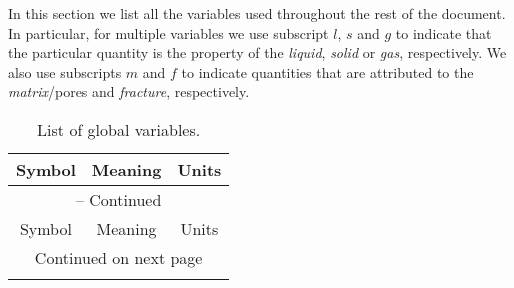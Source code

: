 In this section we list all the variables used throughout the rest of the document.
In particular,
for multiple variables we use subscript 
$l$, $s$ and $g$
to indicate that the particular quantity is the property of the  
\emph{liquid}, \emph{solid} or \emph{gas}, respectively.
We also use subscripts $m$ and $f$
to indicate quantities that are attributed to the  
\emph{matrix}/pores and  \emph{fracture}, respectively.


\begin{center}
\begin{longtable}{cp{7cm}c}
\caption{List of global variables.} \label{table:flow-list-of-variables} \\

\multicolumn{1}{c}{Symbol} & \multicolumn{1}{c}{Meaning} & \multicolumn{1}{c}{Units} \\
\hline  \hline 
\endfirsthead

\multicolumn{3}{c}{{\tablename} \thetable{} -- Continued} \\
\multicolumn{1}{c}{Symbol} & \multicolumn{1}{c}{Meaning} & \multicolumn{1}{c}{Units} \\
\hline  \hline 
\endhead

\hline \multicolumn{3}{c}{{Continued on next page}} \\ 
\hline \hline 
\endfoot

\hline \hline
\endlastfoot


\end{longtable}
\end{center}
